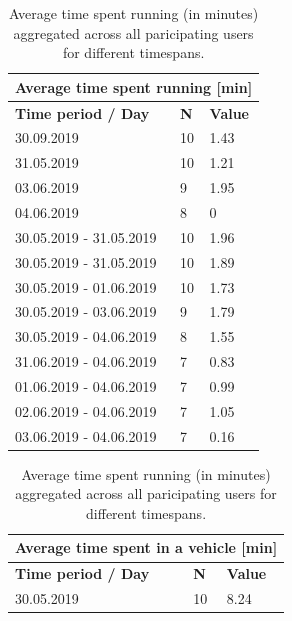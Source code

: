 \begin{table}[]
	\parbox{.40\linewidth}{
		\centering
		\begin{tabular}{|l|l|l|}
			\hline
			\multicolumn{3}{|c|}{\textbf{Average time spent running {[}min{]}}}          \\ \hline
			\textbf{Time period / Day} & \textbf{N} & \textbf{Value} \\ \hline
			30.09.2019                 & 10         & 1.43                     \\ \hline
			31.05.2019                 & 10         & 1.21                     \\ \hline
			03.06.2019                 & 9          & 1.95                     \\ \hline
			04.06.2019                 & 8          & 0                        \\ \hline
			30.05.2019 - 31.05.2019    & 10         & 1.96                     \\ \hline
			30.05.2019 - 31.05.2019    & 10         & 1.89                     \\ \hline
			30.05.2019 - 01.06.2019    & 10         & 1.73                     \\ \hline
			30.05.2019 - 03.06.2019    & 9          & 1.79                     \\ \hline
			30.05.2019 - 04.06.2019    & 8          & 1.55                     \\ \hline
			31.06.2019 - 04.06.2019    & 7          & 0.83                     \\ \hline
			01.06.2019 - 04.06.2019    & 7          & 0.99                     \\ \hline
			02.06.2019 - 04.06.2019    & 7          & 1.05                     \\ \hline
			03.06.2019 - 04.06.2019    & 7          & 0.16                     \\ \hline
		\end{tabular}
		\caption{Average time spent running (in minutes) aggregated across all paricipating users for different timespans.}
		\label{results-running}
	}
	\hfill
	\parbox{.50\linewidth}{
		\begin{tabular}{|l|l|l|}
			\hline
			\multicolumn{3}{|c|}{\textbf{Average time spent in a vehicle {[}min{]}}}     \\ \hline
			\textbf{Time period / Day} & \textbf{N} & \textbf{Value} \\ \hline
			30.05.2019                 & 10         & 8.24                     \\ \hline

\end{tabular}}
\end{table}
